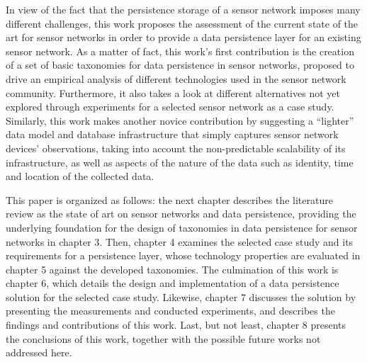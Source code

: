 In view of the fact that the persistence storage of a sensor network imposes
many different challenges, this work proposes the assessment of the current
state of the art for sensor networks in order to provide a data persistence
layer for an existing sensor network. As a matter of fact, this work’s first
contribution is the creation of a set of basic taxonomies for data persistence
in sensor networks, proposed to drive an empirical analysis of different
technologies used in the sensor network community. Furthermore, it also takes a
look at different alternatives not yet explored through experiments for a
selected sensor network as a case study. Similarly, this work makes another
novice contribution by suggesting a “lighter” data model and database
infrastructure that simply captures sensor network devices' observations,
taking into account the non-predictable scalability of its infrastructure, as
well as aspects of the nature of the data such as identity, time and location
of the collected data.

This paper is organized as follows: the next chapter describes the literature
review as the state of art on sensor networks and data persistence, providing
the underlying foundation for the design of taxonomies in data persistence for
sensor networks in chapter 3. Then, chapter 4 examines the selected case study
and its requirements for a persistence layer, whose technology properties are
evaluated in chapter 5 against the developed taxonomies. The culmination of
this work is chapter 6, which details the design and implementation of a data
persistence solution for the selected case study. Likewise, chapter 7 discusses
the solution by presenting the measurements and conducted experiments, and
describes the findings and contributions of this work. Last, but not least,
chapter 8 presents the conclusions of this work, together with the possible
future works not addressed here.
